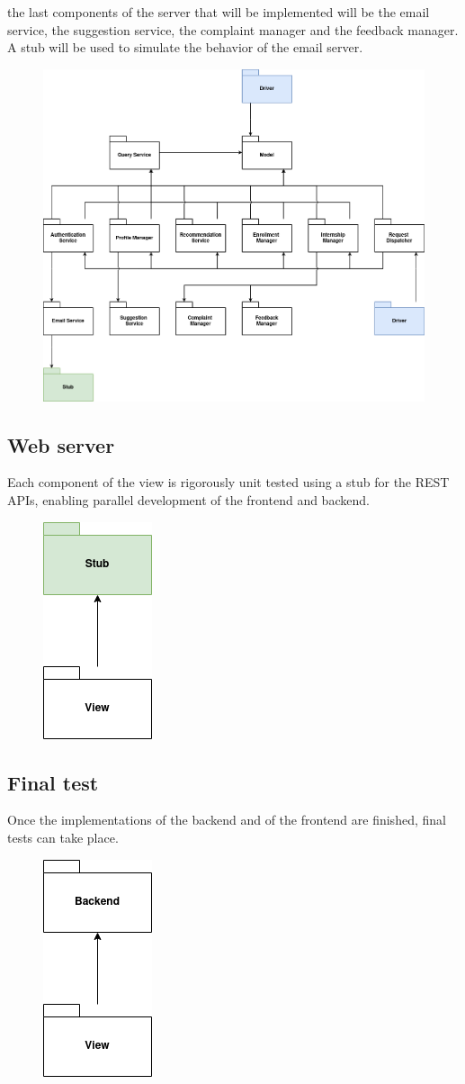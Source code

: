 the last components of the server that will be implemented will be the email service, the suggestion service, the complaint manager and the feedback manager.
A stub will be used to simulate the behavior of the email server.

\begin{figure}[H]
    \centering
    \includegraphics[width=0.8\linewidth]{../assets/implementation-plan-diagrams/implementation-plan-4.png}
\end{figure}

\subsection{Web server}

Each component of the view is rigorously unit tested using a stub for the REST APIs, enabling parallel development of the frontend and backend.

\begin{figure}[H]
    \centering
    \includegraphics[width=0.1\linewidth]{../assets/implementation-plan-diagrams/implementation-plan-5.png}
\end{figure}

\subsection{Final test}

Once the implementations of the backend and of the frontend are finished, final tests can take place.

\begin{figure}[H]
    \centering
    \includegraphics[width=0.1\linewidth]{../assets/implementation-plan-diagrams/implementation-plan-6.png}
\end{figure}

